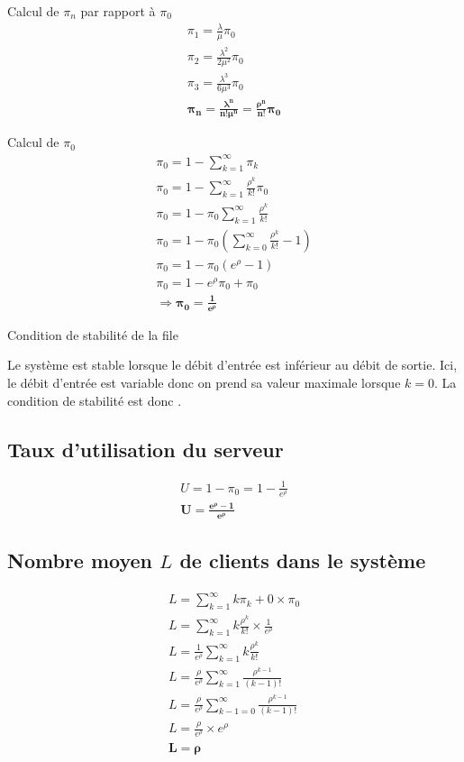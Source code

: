 \documentclass[12pt, a4paper]{article}
\begin{document}
\quad Calcul de $\pi_{n}$ par rapport \`a $\pi_{0}$
\begin{gather*}
\pi_{1} = \frac{\lambda}{\mu}\pi_{0} \\
\pi_{2} = \frac{\lambda^{2}}{2\mu^{2}}\pi_{0} \\
\pi_{3} = \frac{\lambda^{3}}{6\mu^{3}}\pi_{0} \\
\bm{\pi_{n} = \frac{\lambda^{n}}{n! \mu^{n}} = \frac{\rho^{n}}{n!} \pi_{0}}
\end{gather*}

\newpage
\quad Calcul de $\pi_{0}$
\begin{gather*}
\pi_{0} = 1 - \sum_{k=1}^{\infty} \pi_{k} \\
\pi_{0} = 1 - \sum_{k=1}^{\infty} \frac{\rho^{k}}{k!} \pi_{0} \\
\pi_{0} = 1 - \pi_{0}\sum_{k=1}^{\infty} \frac{\rho^{k}}{k!} \\
\pi_{0} = 1 - \pi_{0}\left(\sum_{k=0}^{\infty} \frac{\rho^{k}}{k!} - 1 \right) \\
\pi_{0} = 1 - \pi_{0} \left(e^{\rho} - 1 \right) \\
\pi_{0} = 1 - e^{\rho}\pi_{0} + \pi_{0} \\
\bm{\Rightarrow \pi_{0}=\frac{1}{e^{\rho}}}
\end{gather*}

\quad Condition de stabilit\'e de la file \newline 

Le syst\`eme est stable lorsque le d\'ebit d'entr\'ee est inf\'erieur au d\'ebit de sortie. Ici, le d\'ebit d'entr\'ee est variable donc on prend sa valeur maximale lorsque $k=0$. La condition de stabilit\'e est donc \bm{$\lambda<\mu$}.

\bigskip

\subsection{Taux d'utilisation du serveur}

\begin{gather*}
U=1-\pi_{0}=1 - \frac{1}{e^{\rho}} \\
\bm{U=\frac{e^{\rho} - 1}{e^{\rho}}}
\end{gather*}

\newpage
\subsection{Nombre moyen $L$ de clients dans le syst\`eme}

\begin{gather*}
L = \sum_{k=1}^{\infty}k\pi_{k} + 0\times\pi_{0} \\
L = \sum_{k=1}^{\infty}k\frac{\rho^{k}}{k!} \times \frac{1}{e^{\rho}} \\
L = \frac{1}{e^{\rho}} \sum_{k=1}^{\infty}k\frac{\rho^{k}}{k!} \\
L = \frac{\rho}{e^{\rho}} \sum_{k=1}^{\infty} \frac{\rho^{k-1}}{(k-1)!} \\
L = \frac{\rho}{e^{\rho}} \sum_{k-1=0}^{\infty} \frac{\rho^{k-1}}{(k-1)!} \\
L=\frac{\rho}{e^{\rho}}\times e^{\rho} \\
\bm{L=\rho}
\end{gather*}
\end{document}
